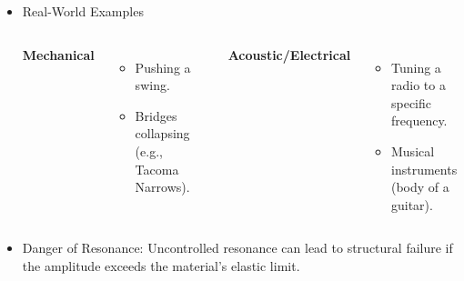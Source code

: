 \documentclass[t,aspectratio=169]{beamer}
\begin{document}
\begin{frame}
\begin{itemize}
\begin{center}
    \end{center}
    \begin{itemize}
        \item \textbf{Peak}: Occurs at the natural frequency.
        \item \textbf{Damping}: Higher damping reduces the peak amplitude and widens the curve.
    \end{itemize}

\pagebreak
\item Real-World Examples
    \begin{columns}
        \textbf{Mechanical}
        \begin{itemize}
            \item Pushing a swing.
            \item Bridges collapsing (e.g., Tacoma Narrows).
        \end{itemize}
        
        \textbf{Acoustic/Electrical}
        \begin{itemize}
            \item Tuning a radio to a specific frequency.
            \item Musical instruments (body of a guitar).
        \end{itemize}
    \end{columns}
    \vspace{0.5cm}
\item Danger of Resonance: Uncontrolled resonance can lead to structural failure if the amplitude exceeds the material's elastic limit.

\end{itemize}
\end{frame}

\end{document}
